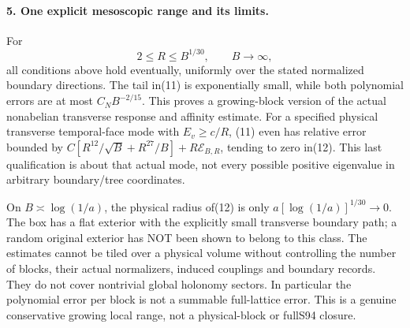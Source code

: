 \documentclass[11pt]{article}
\begin{document}
\paragraph{5. One explicit mesoscopic range and its limits.}
For
\[
 2\le R\le B^{1/30},\qquad B\to\infty,                                \tag{12}
\]
all conditions above hold eventually, uniformly over the stated normalized
boundary directions. The tail in(11) is exponentially small, while both
polynomial errors are at most $C_N B^{-2/15}$. This proves a growing-block
version of the actual nonabelian transverse response and affinity estimate.
For a specified physical transverse temporal-face mode with
$E_v\ge c/R$, (11) even has relative error bounded by
$C[R^{12}/\sqrt B+R^{27}/B]+R\mathcal E_{B,R}$, tending to zero in(12).
This last qualification is about that actual mode, not every possible
positive eigenvalue in arbitrary boundary/tree coordinates.

On $B\asymp\log(1/a)$, the physical radius of(12) is only
$a[\log(1/a)]^{1/30}\to0$. The box has a flat exterior with the explicitly
small transverse boundary path; a random original exterior has NOT been
shown to belong to this class. The estimates cannot be tiled over a physical
volume without controlling the number of blocks, their actual normalizers,
induced couplings and boundary records. They do not cover nontrivial global
holonomy sectors. In particular the polynomial error per block is not a
summable full-lattice error. This is a genuine conservative growing local
range, not a physical-block or fullS94 closure.
\end{document}
